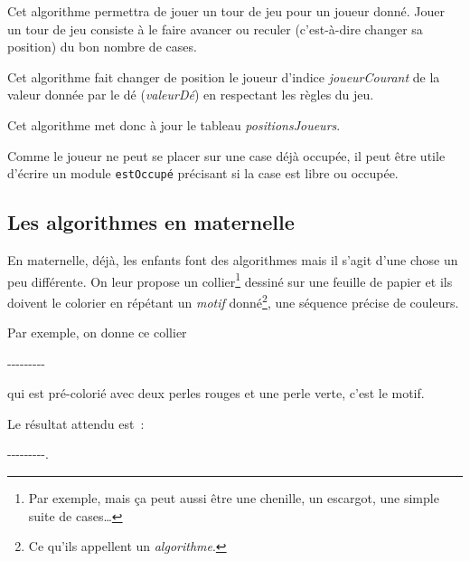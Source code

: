 			Cet algorithme permettra de jouer un tour de jeu pour un joueur
			donné. Jouer un tour de jeu consiste à le faire avancer ou reculer
			(c’est-à-dire changer sa position) du bon nombre de cases. 
	
			\begin{pseudocode}
			\end{pseudocode}
		
			Cet algorithme fait changer de position le joueur d’indice
			\textit{joueurCourant} de la valeur donnée par le dé
			(\textit{valeurDé}) en respectant les règles du jeu. 
		
			Cet algorithme met donc à jour le tableau \textit{positionsJoueurs}. 
		
			Comme le joueur ne peut se placer sur une case déjà occupée, il peut
			être utile d’écrire un module \texttt{estOccupé} précisant si la
			case est libre ou occupée.  
	


	\subsection{Les algorithmes en maternelle}

		En maternelle, déjà, les enfants font des algorithmes 
		mais il s’agit d’une chose un peu différente.
		On leur propose un collier\footnote{%
			Par exemple, mais ça peut aussi être une chenille,
			un escargot, une simple suite de cases\dots
		}
		dessiné sur une feuille de papier 
		et ils doivent le colorier en répétant un
		\emph{motif} donné\footnote{%
			Ce qu’ils appellent un \emph{algorithme}.
		}, 
		une séquence précise de couleurs.
		
		Par exemple, on donne ce collier 
		 
		---------\ 
		
		qui est pré-colorié avec deux perles rouges et une perle verte, c’est le
		motif.  
		
		Le résultat attendu est~:
		
		---------.
		
